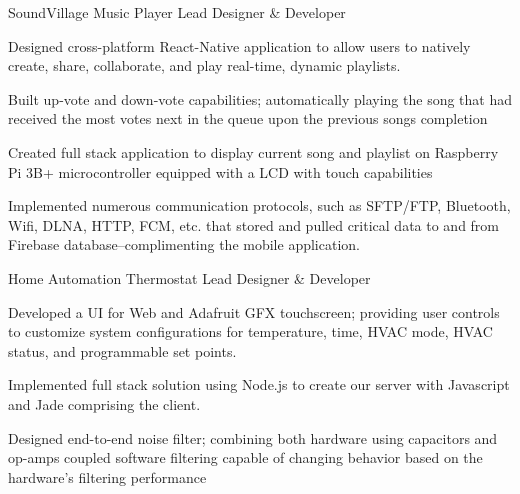 \begin{cventries}
  \cventry
    {} %
    {SoundVillage Music Player} %
    {Lead Designer \& Developer}
    {}
    {
      \begin{cvitems} %
        \item {Designed cross-platform React-Native application to allow users to natively create, share, collaborate, and play real-time, dynamic playlists.}
        \item {Built up-vote and down-vote capabilities; automatically playing the song that had received the most votes next in the queue upon the previous songs completion}
        \item {Created full stack application to display current song and playlist on Raspberry Pi 3B+ microcontroller equipped with a LCD with touch capabilities}
        \item {Implemented numerous communication protocols, such as SFTP/FTP, Bluetooth, Wifi, DLNA, HTTP, FCM, etc. that stored and pulled critical data to and from Firebase database--complimenting the mobile application.}
      \end{cvitems}
    }




  \cventry
    {} %
    {Home Automation Thermostat} %
    {Lead Designer \& Developer}
    {}
    {
      \begin{cvitems} %
        \item {Developed a UI for Web and Adafruit GFX touchscreen; providing user controls to customize system configurations for temperature, time, HVAC mode, HVAC status, and programmable set points.}
        \item {Implemented full stack solution using Node.js to create our server with Javascript and Jade comprising the client.}
        \item {Designed end-to-end noise filter; combining both hardware using capacitors and op-amps coupled software filtering capable of changing behavior based on the hardware's filtering performance
        }
      \end{cvitems}
    }
    

\end{cventries}
